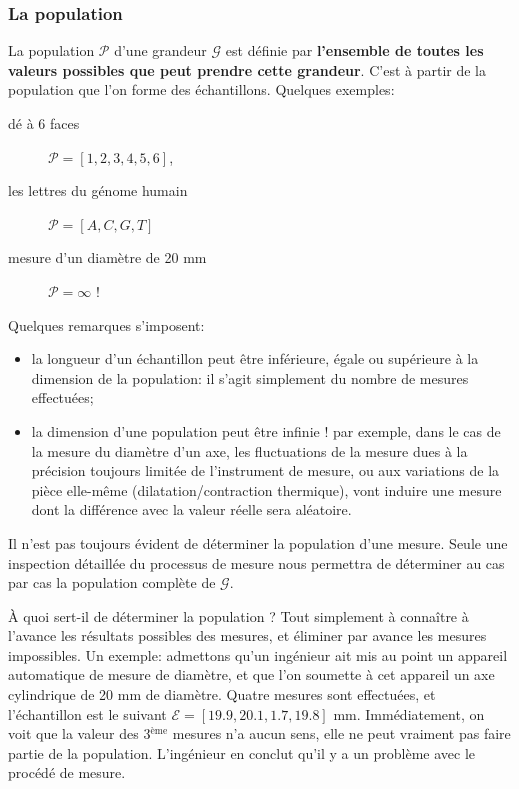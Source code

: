 \documentclass[main.tex]{subfiles}
\begin{document}
\subsubsection{La population}

La population $\mathcal{P}$ d'une grandeur $\mathcal{G}$ est définie par \textbf{l'ensemble de toutes les valeurs possibles que peut prendre cette grandeur}. C'est à partir de la population que l'on forme des échantillons. Quelques exemples:
\begin{description}
    \item[dé à 6 faces] $\mathcal{P}=[1,2,3,4,5,6]$,
    \item[les lettres du génome humain] $\mathcal{P}=[A,C,G,T]$
    \item[mesure d'un diamètre de 20 mm] $\mathcal{P}=\infty$ !
\end{description}
Quelques remarques s'imposent:
\begin{itemize}
    \item la longueur d'un échantillon peut être inférieure, égale ou supérieure à la dimension de la population: il s'agit simplement du nombre de mesures effectuées;
    \item la dimension d'une population peut être infinie ! par exemple, dans le cas de la mesure du diamètre d'un axe, les fluctuations de la mesure dues à la précision toujours limitée de l'instrument de mesure, ou aux variations de la pièce elle-même (dilatation/contraction thermique), vont induire une mesure dont la différence avec la valeur réelle sera aléatoire.
\end{itemize}
Il n'est pas toujours évident de déterminer la population d'une mesure. Seule une inspection détaillée du processus de mesure nous permettra de déterminer au cas par cas la population complète de $\mathcal{G}$.

À quoi sert-il de déterminer la population ? Tout simplement à connaître à l'avance les résultats possibles des mesures, et éliminer par avance les mesures impossibles. Un exemple: admettons qu'un ingénieur ait mis au point un appareil automatique de mesure de diamètre, et que l'on soumette à cet appareil un axe cylindrique de 20 mm de diamètre. Quatre mesures sont effectuées, et l'échantillon est le suivant $\mathcal{E}=[19.9,20.1,1.7,19.8]$ mm. Immédiatement, on voit que la valeur des 3$^\text{ème}$ mesures n'a aucun sens, elle ne peut vraiment pas faire partie de la population. L'ingénieur en conclut qu'il y a un problème avec le procédé de mesure.
\end{document}
